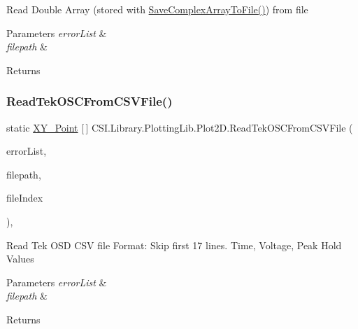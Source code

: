 Read Double Array (stored with \mbox{\hyperlink{class_c_s_i_1_1_library_1_1_plotting_lib_1_1_plot2_d_a0959acd193403a2feaaad7940884ad12}{Save\+Complex\+Array\+To\+File()}}) from file 


\begin{DoxyParams}{Parameters}
{\em error\+List} & \\
\hline
{\em filepath} & \\
\hline
\end{DoxyParams}
\begin{DoxyReturn}{Returns}

\end{DoxyReturn}
\mbox{\label{class_c_s_i_1_1_library_1_1_plotting_lib_1_1_plot2_d_a07bb248c172593f7bd5554a8452135e4}} 
\subsubsection{\texorpdfstring{ReadTekOSCFromCSVFile()}{ReadTekOSCFromCSVFile()}}
{\footnotesize\ttfamily static \mbox{\hyperlink{struct_c_s_i_1_1_library_1_1_data_types_1_1_x_y___point}{X\+Y\+\_\+\+Point}} \mbox{[}$\,$\mbox{]} C\+S\+I.\+Library.\+Plotting\+Lib.\+Plot2\+D.\+Read\+Tek\+O\+S\+C\+From\+C\+S\+V\+File (\begin{DoxyParamCaption}\item[{\mbox{\hyperlink{class_c_s_i_1_1_library_1_1_errors_1_1_error_list}{Error\+List}}}]{error\+List,  }\item[{string}]{filepath,  }\item[{int}]{file\+Index }\end{DoxyParamCaption})\hspace{0.3cm}{\ttfamily [inline]}, {\ttfamily [static]}}



Read Tek O\+SD C\+SV file Format\+: Skip first 17 lines. Time, Voltage, Peak Hold Values 


\begin{DoxyParams}{Parameters}
{\em error\+List} & \\
\hline
{\em filepath} & \\
\hline
\end{DoxyParams}
\begin{DoxyReturn}{Returns}

\end{DoxyReturn}
\mbox{\label{class_c_s_i_1_1_library_1_1_plotting_lib_1_1_plot2_d_ae13604c7f537fce584a79105c415fef2}} 
